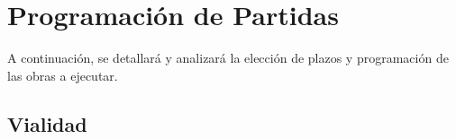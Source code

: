 \section{Programación de Partidas}

A continuación, se detallará y analizará la elección de plazos y programación de las obras a ejecutar.

\subsection{Vialidad}


